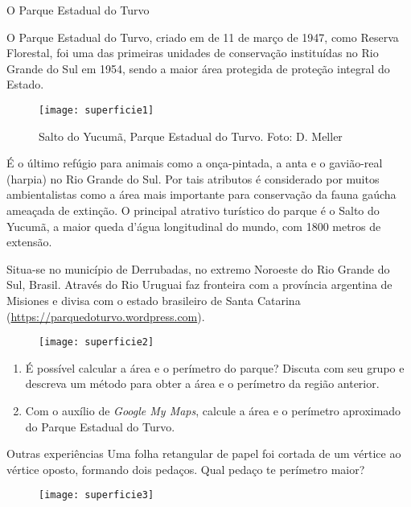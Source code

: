 \begin{task}{O Parque Estadual do Turvo}

\begin{multicols}{2}

O Parque Estadual do Turvo, criado em de 11 de março de 1947, como Reserva Florestal, foi uma das primeiras unidades de conservação instituídas no Rio Grande do Sul em 1954, sendo a maior área protegida de proteção integral do Estado.

\begin{figure}[H]
\centering

\texttt{[image: superficie1]}

\caption{Salto do Yucumã, Parque Estadual do Turvo. Foto: D. Meller}
\end{figure}

\end{multicols}

É o último refúgio para animais como a onça-pintada, a anta e o gavião-real (harpia) no Rio Grande do Sul. Por tais atributos é considerado por muitos ambientalistas como a área mais importante para conservação da fauna gaúcha ameaçada de extinção. O principal atrativo turístico do parque é o Salto do Yucumã, a maior queda d’água longitudinal do mundo, com 1800 metros de extensão.

Situa-se no município de Derrubadas, no extremo Noroeste do Rio Grande do Sul, Brasil. Através do Rio Uruguai faz fronteira com a província argentina de Misiones e divisa com o estado brasileiro de Santa Catarina (\url{https://parquedoturvo.wordpress.com}).

\begin{figure}[H]
\centering

\texttt{[image: superficie2]}

\end{figure}

\begin{enumerate}
  \item É possível calcular a área e o perímetro do parque? Discuta com seu grupo e descreva um método para obter a área e o perímetro da região anterior.
  \item Com o auxílio de \textit{Google My Maps}, calcule a área e o perímetro aproximado do Parque Estadual do Turvo.
\end{enumerate}
\end{task}

\begin{task}{Outras experiências}
Uma folha retangular de papel foi cortada de um vértice ao vértice oposto, formando dois pedaços. Qual pedaço te perímetro maior?
\begin{figure}[H]
\centering

\texttt{[image: superficie3]}

\end{figure}
\end{task}

